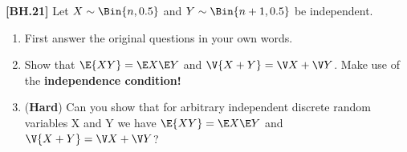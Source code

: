 \begin{exercise}
	\textbf{[BH.21]} Let $X \sim \Bin{n, 0.5}$ and $Y \sim \Bin{n + 1, 0.5}$ be independent.
	\begin{enumerate} 
		\item First answer the original questions in your own words.
		\item Show that $\E{XY}= \E X\E Y$ and $\V{X+Y}=\V X+\V Y$. Make use of the \textbf{independence condition!}  
		\item (\textbf{Hard}) Can you show that for arbitrary independent discrete random variables X and Y we have  $\E{XY}=\E X\E Y$ and $\V{X+Y}=\V X+\V Y$?
	\end{enumerate}
\end{exercise}
